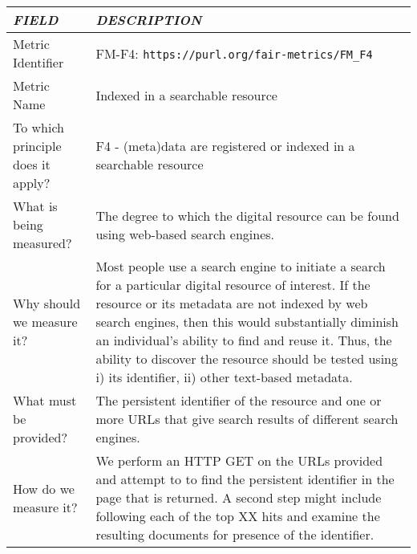 \documentclass[english]{article}
\begin{document}
\begin{longtable}{|p{5cm}|p{9cm}|}


\hline
\emph{FIELD} & \emph{DESCRIPTION} \\
\hline
Metric Identifier &   FM-F4: \verb"https://purl.org/fair-metrics/FM_F4"
 \\


\hline
Metric Name &   


Indexed in a searchable resource



 \\



\hline
To which principle does it apply? &   

F4 - (meta)data are registered or indexed in a searchable resource

\\



\hline
What is being measured? & 



The degree to which the digital resource can be found using  web-based search engines.


\\



\hline
Why should we measure it? & 




Most people use a search engine to initiate a search for a particular digital resource of interest. If the resource or its metadata are not indexed by web search engines, then this would substantially diminish an individual’s ability to find and reuse it. Thus, the ability to discover the resource should be tested using i) its identifier, ii) other text-based metadata. 


  
\\



\hline
What must be provided? &  


The persistent identifier of the resource and one or more URLs that give search results of different search engines.



\\



\hline
How do we measure it? &  


We perform an HTTP GET on the URLs provided and attempt to to find the persistent identifier in the page that is returned. A second step might include following each of the top XX hits and examine the resulting documents for presence of the identifier. 



\end{longtable}
\end{document}
